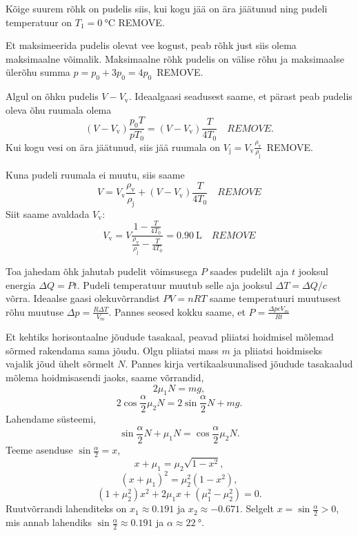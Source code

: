 \documentclass[10pt]{article}
\newcommand{\pp}[1]{REMOVE}
\begin{document}
\solu
Kõige suurem rõhk on pudelis siis, kui kogu jää on ära jäätunud ning pudeli temperatuur on $T_1=\SI{0}{\celsius}$ \pp{1}. \par
Et maksimeerida pudelis olevat vee kogust, peab rõhk just siis olema maksimaalne võimalik. Maksimaalne rõhk pudelis on välise rõhu ja maksimaalse ülerõhu summa $p=p_0+3p_0=4p_0$~\pp1. \par
Algul on õhku pudelis $V-V_{\text{v}}$. Ideaalgaasi seadusest saame, et pärast peab pudelis oleva õhu ruumala olema
$$(V-V_{\text{v}})\frac{p_0T}{pT_0}=(V-V_{\text{v}}) \frac{T}{4T_0} \quad \pp2.$$
Kui kogu vesi on ära jäätunud, siis jää ruumala on $V_{\text{j}}=V_{\text{v}}\frac{\rho_{\text{v}}}{\rho_{\text{j}}}$~\pp1. \par
Kuna pudeli ruumala ei muutu, siis saame
$$V=V_{\text{v}}\frac{\rho_{\text{v}}}{\rho_{\text{j}}} + (V-V_{\text{v}}) \frac{T}{4T_0} \quad \pp2$$
Siit saame avaldada $V_{\text{v}}$:
$$V_{\text{v}}=V \frac{1-\frac{T}{4T_0}}{\frac{\rho_{\text{v}}}{\rho_{\text{j}}}-\frac{T}{4T_0}} = \SI{0.90}{\liter} \quad \pp1$$
\probend
\bigskip


\solu
Toa jahedam õhk jahutab pudelit võimsusega $P$ saades pudelilt aja $t$ jooksul energia $\Delta Q = Pt$. Pudeli temperatuur muutub selle aja jooksul $\Delta T = \Delta Q/c$ võrra. Ideaalse gaasi olekuvõrrandist $PV=nRT$ saame temperatuuri muutusest rõhu muutuse $\Delta p = \frac{R \Delta T}{V_m} $. Pannes seosed kokku saame, et $P = \frac{\Delta p c V_m }{Rt}$
\probend
\bigskip


\solu
Et kehtiks horisontaalne jõudude tasakaal, peavad pliiatsi hoidmisel mõlemad sõrmed rakendama sama jõudu. Olgu pliiatsi mass $m$ ja pliiatsi hoidmiseks vajalik jõud ühelt sõrmelt $N$. Pannes kirja vertikaalsuunalised jõudude tasakaalud mõlema hoidmisasendi jaoks, saame võrrandid,
\[2\mu_1 N = mg ,\]
\[2 \cos\frac{\alpha}{2}\mu_2N= 2\sin\frac{\alpha}{2}N + mg .\]
Lahendame süsteemi,
\[\sin\frac{\alpha}{2} N + \mu_1 N = \cos\frac{\alpha}{2}\mu_2 N .\]
Teeme asenduse $\sin{\frac{\alpha}{2}} = x$,
\[x + \mu_1 = \mu_2 \sqrt{1-x^2},\]
\[(x + \mu_1)^2 = \mu_2^2(1-x^2),\]
\[(1+\mu_2^2) x^2 + 2\mu_1 x + (\mu_1^2 - \mu_2^2) = 0.\]
Ruutvõrrandi lahenditeks on $x_1 \approx 0.191$ ja $x_2 \approx -0.671$. Selgelt  $x=\sin\frac{\alpha}{2} > 0$, mis annab lahendiks $\sin\frac{\alpha}{2} \approx 0.191$ ja $\alpha \approx \SI{22}{\degree}$.
\probend
\bigskip
\end{document}

